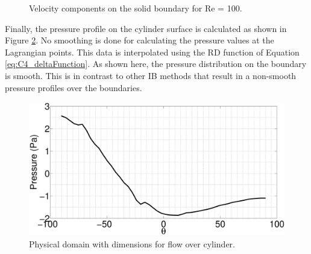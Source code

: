 \begin{figure}[H]
    \centering
    \quad
    \caption{Velocity components on the solid boundary for Re = 100.}
    \label{fig:C4_fluidVelocityOnCylinder}
\end{figure}
%
Finally, the pressure profile on the cylinder surface is calculated as shown in Figure \ref{fig:C4_pressureOnSurfaceCylinder}. No smoothing is done for calculating the pressure values at the Lagrangian points. This data is interpolated using the RD function of Equation \eqref{eq:C4_deltaFunction}. As shown here, the pressure distribution on the boundary is smooth. This is in contrast to other IB methods that result in a non-smooth pressure profiles over the boundaries.
%
\begin{figure}[H]
    \centering
    \includegraphics[width=12.00cm]{Chapter_4/figure/flow_over_cylinder/p_on_boundary_RE100.eps}
    \caption{Physical domain with dimensions for flow over cylinder.}
    \label{fig:C4_pressureOnSurfaceCylinder}
\end{figure}
